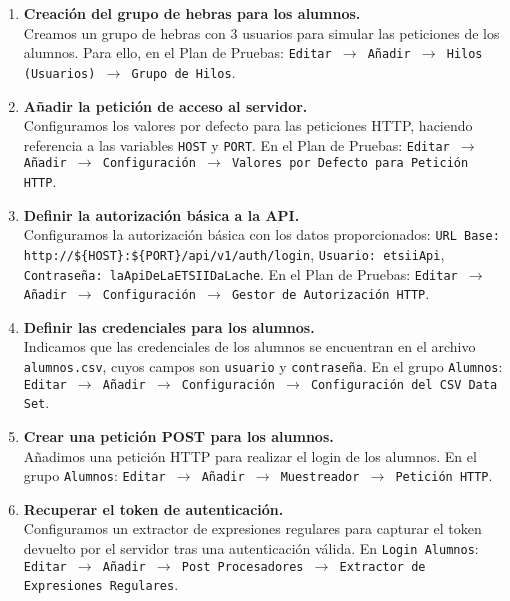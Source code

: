 \begin{enumerate}
\begin{enumerate}
            \item \textbf{Creación del grupo de hebras para los alumnos.} \\
            Creamos un grupo de hebras con 3 usuarios para simular las peticiones de los alumnos. Para ello, en el Plan de Pruebas: \texttt{Editar $\rightarrow$ Añadir $\rightarrow$ Hilos (Usuarios) $\rightarrow$ Grupo de Hilos}.

            \item \textbf{Añadir la petición de acceso al servidor.} \\
            Configuramos los valores por defecto para las peticiones HTTP, haciendo referencia a las variables \texttt{HOST} y \texttt{PORT}. En el Plan de Pruebas: \texttt{Editar $\rightarrow$ Añadir $\rightarrow$ Configuración $\rightarrow$ Valores por Defecto para Petición HTTP}.

            \item \textbf{Definir la autorización básica a la API.} \\
            Configuramos la autorización básica con los datos proporcionados: \texttt{URL Base: http://\$\{HOST\}:\$\{PORT\}/api/v1/auth/login}, \texttt{Usuario: etsiiApi}, \texttt{Contraseña: laApiDeLaETSIIDaLache}. En el Plan de Pruebas: \texttt{Editar $\rightarrow$ Añadir $\rightarrow$ Configuración $\rightarrow$ Gestor de Autorización HTTP}.

            \item \textbf{Definir las credenciales para los alumnos.} \\
            Indicamos que las credenciales de los alumnos se encuentran en el archivo \texttt{alumnos.csv}, cuyos campos son \texttt{usuario} y \texttt{contraseña}. En el grupo \texttt{Alumnos}: \texttt{Editar $\rightarrow$ Añadir $\rightarrow$ Configuración $\rightarrow$ Configuración del CSV Data Set}.

            \item \textbf{Crear una petición POST para los alumnos.} \\
            Añadimos una petición HTTP para realizar el login de los alumnos. En el grupo \texttt{Alumnos}: \texttt{Editar $\rightarrow$ Añadir $\rightarrow$ Muestreador $\rightarrow$ Petición HTTP}.

            \item \textbf{Recuperar el token de autenticación.} \\
            Configuramos un extractor de expresiones regulares para capturar el token devuelto por el servidor tras una autenticación válida. En \texttt{Login Alumnos}: \texttt{Editar $\rightarrow$ Añadir $\rightarrow$ Post Procesadores $\rightarrow$ Extractor de Expresiones Regulares}.


\end{enumerate}
\end{enumerate}
